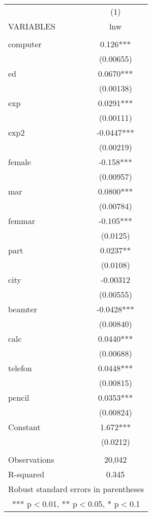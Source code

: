 \begin{tabular}{lc} \hline
 & (1) \\
VARIABLES & lnw \\ \hline
 &  \\
computer & 0.126*** \\
 & (0.00655) \\
ed & 0.0670*** \\
 & (0.00138) \\
exp & 0.0291*** \\
 & (0.00111) \\
exp2 & -0.0447*** \\
 & (0.00219) \\
female & -0.158*** \\
 & (0.00957) \\
mar & 0.0800*** \\
 & (0.00784) \\
femmar & -0.105*** \\
 & (0.0125) \\
part & 0.0237** \\
 & (0.0108) \\
city & -0.00312 \\
 & (0.00555) \\
beamter & -0.0428*** \\
 & (0.00840) \\
calc & 0.0440*** \\
 & (0.00688) \\
telefon & 0.0448*** \\
 & (0.00815) \\
pencil & 0.0353*** \\
 & (0.00824) \\
Constant & 1.672*** \\
 & (0.0212) \\
 &  \\
Observations & 20,042 \\
 R-squared & 0.345 \\ \hline
\multicolumn{2}{c}{ Robust standard errors in parentheses} \\
\multicolumn{2}{c}{ *** p$<$0.01, ** p$<$0.05, * p$<$0.1} \\
\end{tabular}

